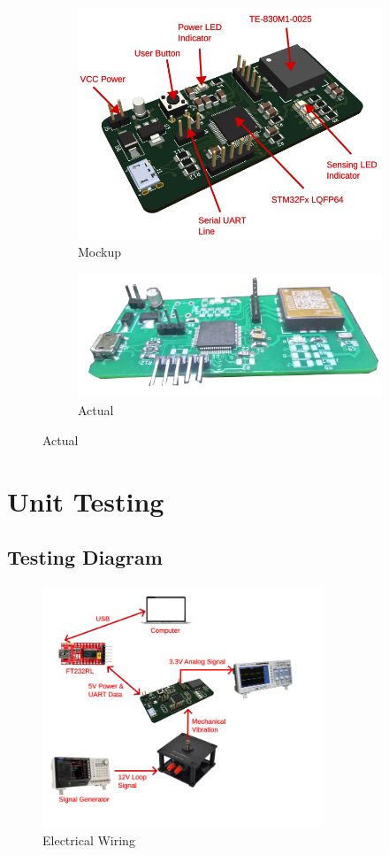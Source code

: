 \documentclass[a4paper,12pt,oneside,pdflatex,italian,final,twocolumn]{article}
\begin{document}
	\begin{figure}[h]
		\centering
		\begin{subfigure}{0.45\textwidth}
			\includegraphics[width=\textwidth]{images/vibparts.png}
			\caption{Mockup}
		\end{subfigure}
		\begin{subfigure}{0.45\textwidth}
			\includegraphics[width=\textwidth]{images/vibs.png}
			\caption{Actual}
		\end{subfigure}
	\end{figure}

	\section{Unit Testing}
	
	\subsection{Testing Diagram}
	
	\begin{figure}[h]
		\centering
		\includegraphics[width=0.75\textwidth]{images/testing.png}
		\caption{Electrical Wiring}
	\end{figure}
\end{document}

